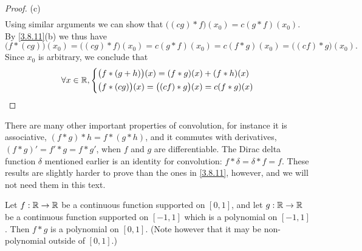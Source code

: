 \begin{proof}{(c)}
\begin{align*}
  \end{align*}
  Using similar arguments we can show that \(\big((cg) * f\big)(x_0) = c (g * f)(x_0)\).
  By \cref{3.8.11}(b) we thus have
  \[
    \big(f * (cg)\big)(x_0) = \big((cg) * f\big)(x_0) = c(g * f)(x_0) = c(f * g)(x_0) = \big((cf) * g\big)(x_0).
  \]
  Since \(x_0\) is arbitrary, we conclude that
  \[
    \forall x \in \mathbb{R}, \begin{dcases}
      \big(f * (g + h)\big)(x) = (f * g)(x) + (f * h)(x) \\
      \big(f * (cg)\big)(x) = \big((cf) * g\big)(x) = c(f * g)(x)
    \end{dcases}
  \]
\end{proof}

\begin{rmk}\label{3.8.12}
  There are many other important properties of convolution, for instance it is associative, \((f * g) * h = f * (g * h)\), and it commutes with derivatives, \((f * g)' = f' * g = f * g'\), when \(f\) and \(g\) are differentiable.
  The Dirac delta function \(\delta\) mentioned earlier is an identity for convolution:
  \(f * \delta = \delta * f = f\).
  These results are slightly harder to prove than the ones in \cref{3.8.11}, however, and we will not need them in this text.
\end{rmk}

\begin{lem}\label{3.8.13}
  Let \(f : \mathbb{R} \to \mathbb{R}\) be a continuous function supported on \([0, 1]\), and let \(g : \mathbb{R} \to \mathbb{R}\) be a continuous function supported on \([-1, 1]\) which is a polynomial on \([-1, 1]\).
  Then \(f * g\) is a polynomial on \([0, 1]\).
  (Note however that it may be non-polynomial outside of \([0, 1].\))
\end{lem}


